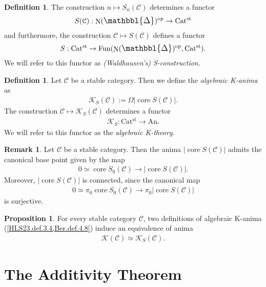 \documentclass[a4paper,dvipdfmx,11pt,reqno]{amsart}
\DeclareMathOperator{\myop}{op}
\DeclareMathOperator{\N}{N}
\DeclareMathOperator{\Fun}{Fun}
\newcommand{\C}{\mathcal{C}}
\newcommand{\K}{\mathcal{K}}
\DeclareMathOperator{\core}{core}
\newcommand{\An}{\mathrm{An}}
\newcommand{\Catst}{\mathrm{Cat^{st}}}
\newcommand{\prism}{{\mathlarger{\mathbbl{\Delta}}}}
\theoremstyle{definition}
\newtheorem{definition}[theorem]{Definition}
\newtheorem{proposition}[theorem]{Proposition}
\newtheorem{remark}[theorem]{Remark}
\begin{document}
\begin{definition} \label{Ber.rem.4.5}
  The construction $n \mapsto S_n(\C)$ determines a functor 
  \begin{align*}
    S(\C) : \N(\prism)^{\myop} \to \Catst
  \end{align*}
  and furthermore, the construction $\C \mapsto S(\C)$ defines a functor 
  \begin{align*}
    S : \Catst \to \Fun(\N(\prism)^{\myop},\Catst).
  \end{align*}
  We will refer to this functor as \textit{(Waldhausen's) S-construction}.
\end{definition}

\begin{definition} \label{Ber.def.4.8}
  Let $\C$ be a stable category.
  Then we define the \textit{algebraic K-anima} as 
  \begin{align*}
    \K_S(\C) := \Omega|\core S(\C)|.
  \end{align*}
  The construction $\C \mapsto \K_S(\C)$ determines a functor 
  \begin{align*}
    \K_S : \Catst \to \An.
  \end{align*}
  We will refer to this functor as the \textit{algebraic K-theory}.
\end{definition}
 
\begin{remark} %
  Let $\C$ be a stable category.
  Then the anima $|\core S(\C)|$ admits the canonical base point given by the map 
  \begin{align*}
    0 \simeq \core S_0(\C) \to |\core S(\C)|.
  \end{align*}
  Moreover, $|\core S(\C)|$ is connected, since the canonical map 
  \begin{align*}
    0 \simeq \pi_0 \core S_0(\C) \to \pi_0 |\core S(\C)|
  \end{align*}
  is surjective.
\end{remark}

\begin{proposition} \label{Ber.prop.4.37}
  For every stable category $\C$, two definitions of algebraic K-anima (\cref{HLS23.def.3.4,Ber.def.4.8}) induce an equivalence of anima
  \begin{align*}
    \K(\C) \simeq \K_S(\C).
  \end{align*}
\end{proposition}

\newpage


\section{The Additivity Theorem}
\end{document}
